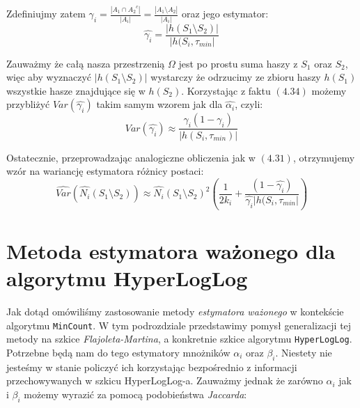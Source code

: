 Zdefiniujmy zatem ${\gamma}_{i} = \frac{|A_1 \cap {A_2}^{c}|}{|A_i|} = \frac{|A_1 \setminus A_2|}{|A_i|}$ oraz jego estymator:
\begin{equation}
    \hat{{\gamma}_i} = \frac{|h(S_1 \setminus S_2)|}{|h(S_i, {\tau}_{min}|}
\end{equation}

Zauważmy że całą nasza przestrzenią $\Omega$ jest po prostu suma haszy z $S_1$ oraz $S_2$, więc aby wyznaczyć $|h(S_1 \setminus S_2)|$ wystarczy że odrzucimy ze zbioru haszy $h(S_1)$ wszystkie hasze znajdujące się w $h(S_2)$. Korzystając z faktu $(4.34)$ możemy przybliżyć $Var(\hat{{\gamma}_i})$ takim samym wzorem jak dla $\hat{{\alpha}_i}$, czyli:
\begin{equation}
    Var(\hat{{\gamma}_i}) \approx \frac{{\gamma}_i(1 - {\gamma}_i)}{|h(S_i, {\tau}_{min})|}
\end{equation}

Ostatecznie, przeprowadzając analogiczne obliczenia jak w $(4.31)$, otrzymujemy wzór na wariancję estymatora różnicy postaci:
\begin{equation}
    \hat{Var}(\hat{N_i}(S_1 \setminus S_2)) \approx \hat{N_i}(S_1 \setminus S_2)^{2}(\frac{1}{2{k}_i} + \frac{(1 - \hat{{\gamma}_i})}{\hat{{\gamma}_i}|h(S_i, {\tau}_{min}|})
\end{equation}


\section{Metoda estymatora ważonego dla algorytmu HyperLogLog}

Jak dotąd omówiliśmy zastosowanie metody \textit{estymatora ważonego} w kontekście algorytmu \texttt{MinCount}. W tym podrozdziale przedstawimy pomysł generalizacji tej metody na szkice \textit{Flajoleta-Martina}, a konkretnie szkice algorytmu \texttt{HyperLogLog}.
\newline
Potrzebne będą nam do tego estymatory mnożników ${\alpha}_i$ oraz ${\beta}_i$. Niestety nie jesteśmy w stanie policzyć ich korzystając bezpośrednio z informacji przechowywanych w szkicu HyperLogLog-a. Zauważmy jednak że zarówno ${\alpha}_i$ jak i ${\beta}_i$ możemy wyrazić za pomocą podobieństwa \textit{Jaccarda}:


